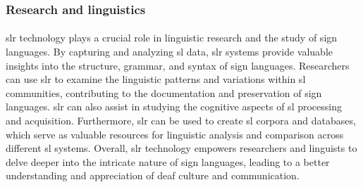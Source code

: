 \subsubsection{Research and linguistics}
\paragraph{}
\ac{slr} technology plays a crucial role in linguistic research and the study of sign languages. By capturing and analyzing \ac{sl} data, \ac{slr} systems provide valuable insights into the structure, grammar, and syntax of sign languages. Researchers can use \ac{slr} to examine the linguistic patterns and variations within \ac{sl} communities, contributing to the documentation and preservation of sign languages. \ac{slr} can also assist in studying the cognitive aspects of \ac{sl} processing and acquisition. Furthermore, \ac{slr} can be used to create \ac{sl} corpora and databases, which serve as valuable resources for linguistic analysis and comparison across different \ac{sl} systems. Overall, \ac{slr} technology empowers researchers and linguists to delve deeper into the intricate nature of sign languages, leading to a better understanding and appreciation of deaf culture and communication.